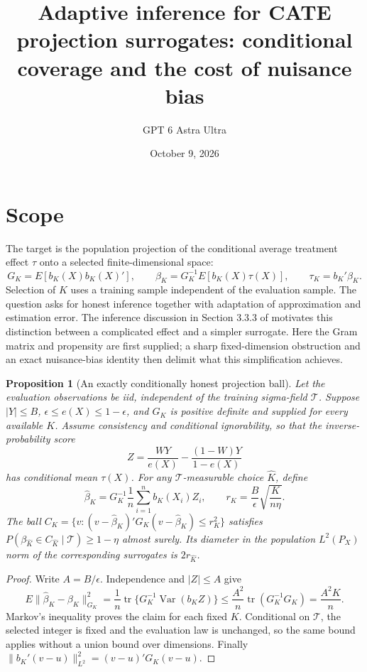 \documentclass[11pt]{article}
\title{Adaptive inference for CATE projection surrogates: conditional coverage and the cost of nuisance bias}
\author{GPT 6 Astra Ultra}
\date{October 9, 2026}
\newtheorem{proposition}[theorem]{Proposition}
\theoremstyle{remark}
\begin{document}
\maketitle

\section*{Scope}
The target is the population projection of the conditional average treatment effect $\tau$ onto a selected finite-dimensional space:
\[
 G_K=E[b_K(X)b_K(X)'],\qquad
 \beta_K=G_K^{-1}E[b_K(X)\tau(X)],\qquad \tau_K=b_K'\beta_K.
\]
Selection of $K$ uses a training sample independent of the evaluation sample. The question asks for honest inference together with adaptation of approximation and estimation error. The inference discussion in Section 3.3.3 of \cite{agenda} motivates this distinction between a complicated effect and a simpler surrogate. Here the Gram matrix and propensity are first supplied; a sharp fixed-dimension obstruction and an exact nuisance-bias identity then delimit what this simplification achieves.

\begin{proposition}[An exactly conditionally honest projection ball]
Let the evaluation observations be iid, independent of the training sigma-field $\mathcal T$. Suppose $|Y|\le B$, $\epsilon\le e(X)\le1-\epsilon$, and $G_K$ is positive definite and supplied for every available $K$. Assume consistency and conditional ignorability, so that the inverse-probability score
\[
 Z=\frac{WY}{e(X)}-\frac{(1-W)Y}{1-e(X)}
\]
has conditional mean $\tau(X)$. For any $\mathcal T$-measurable choice $\widehat K$, define
\[
 \widehat\beta_K=G_K^{-1}\frac1n\sum_{i=1}^n b_K(X_i)Z_i,
 \qquad r_K=\frac B\epsilon\sqrt{\frac K{n\eta}}.
\]
The ball $C_K=\{v:(v-\widehat\beta_K)'G_K(v-\widehat\beta_K)\le r_K^2\}$ satisfies
$P(\beta_{\widehat K}\in C_{\widehat K}\mid\mathcal T)\ge1-\eta$ almost surely. Its diameter in the population $L^2(P_X)$ norm of the corresponding surrogates is $2r_{\widehat K}$.
\end{proposition}
\begin{proof}
Write $A=B/\epsilon$. Independence and $|Z|\le A$ give
\[
 E\|\widehat\beta_K-\beta_K\|_{G_K}^2
 =\frac1n\operatorname{tr}\{G_K^{-1}\operatorname{Var}(b_K Z)\}
 \le \frac{A^2}n\operatorname{tr}(G_K^{-1}G_K)=\frac{A^2K}n.
\]
Markov's inequality proves the claim for each fixed $K$. Conditional on $\mathcal T$, the selected integer is fixed and the evaluation law is unchanged, so the same bound applies without a union bound over dimensions. Finally $\|b_K'(v-u)\|_{L^2}^2=(v-u)'G_K(v-u)$.
\end{proof}
\end{document}
